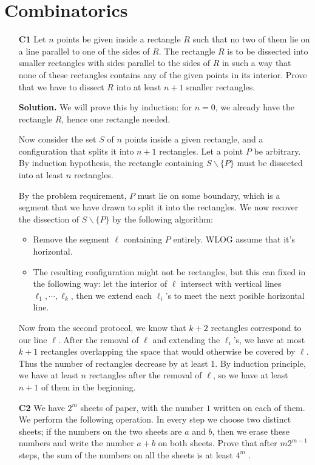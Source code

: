 \documentclass[11pt,a4paper]{article}
\begin{document}
\section*{Combinatorics}
\begin{enumerate}
	\item[\textbf{C1}] Let $n$ points be given inside a rectangle $R$ such that no two of them lie on a line parallel to one of the sides of $R$. The rectangle $R$ is to be dissected into smaller rectangles with sides parallel to the sides of $R$ in such a way that none of these rectangles contains any of the given points in its interior. Prove that we have to dissect $R$ into at least $n + 1$ smaller rectangles.
	
	\textbf{Solution.} We will prove this by induction: for $n=0$, we already have the rectangle $R$, hence one rectangle needed. 
	
	Now consider the set $S$ of $n$ points inside a given rectangle, and a configuration that splits it into $n+1$ rectangles.  Let a point $P$ be arbitrary. By induction hypothesis, the rectangle containing $S\backslash \{P\}$ must be dissected into at least $n$ rectangles. 
	
	By the problem requirement, $P$ must lie on some boundary, which is a segment that we have drawn to split it into the rectangles. We now recover the dissection of $S\backslash \{P\}$ by the following algorithm: 
	\begin{itemize}
		\item Remove the segment $\ell$ containing $P$ entirely. WLOG assume that it's horizontal. 
		
		\item The resulting configuration might not be rectangles, but this can fixed in the following way: let the interior of $\ell$ intersect with vertical lines $\ell_1, \cdots , \ell_k$, then we extend each $\ell_i$'s to meet the next posible horizontal line. 
	\end{itemize}
	Now from the second protocol, we know that $k+2$ rectangles correspond to our line $\ell$. After the removal of $\ell$ and extending the $\ell_i$'s, we have at most $k+1$ rectangles overlapping the space that would otherwise be covered by $\ell$. Thus the number of rectangles decrease by at least 1. By induction principle, we have at least $n$ rectangles after the removal of $\ell$, so we have at least $n+1$ of them in the beginning. 
	
	\item[\textbf{C2}] We have $2^m$ sheets of paper, with the number $1$ written on each of them. We perform the following operation. In every step we choose two distinct sheets; if the numbers on the two sheets are $a$ and $b$, then we erase these numbers and write the number $a + b$ on both sheets. Prove that after $m2^{m -1}$ steps, the sum of the numbers on all the sheets is at least $4^m$ .
	

\end{enumerate}
\end{document}
